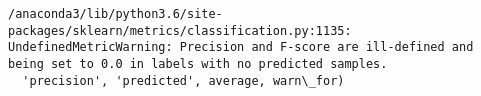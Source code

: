 \documentclass[11pt]{article}
\begin{document}
    \begin{Verbatim}[commandchars=\\\{\}]
/anaconda3/lib/python3.6/site-packages/sklearn/metrics/classification.py:1135: UndefinedMetricWarning: Precision and F-score are ill-defined and being set to 0.0 in labels with no predicted samples.
  'precision', 'predicted', average, warn\_for)

    \end{Verbatim}


    
    
    
    
\end{document}

